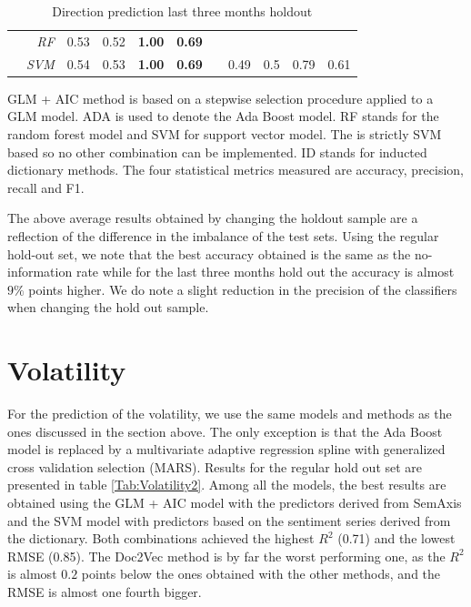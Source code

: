 \documentclass[a4paper, 12pt]{report}
\begin{document}
\begin{table}[H]
\begin{threeparttable}
\begin{tabular}{rrrrrrrrrrr}
      & \textit{RF} & 0.53 & 0.52 & \textbf{1.00} & \textbf{0.69} &  \multicolumn{5}{c}{}\\ 
      & \textit{SVM} & 0.54 & 0.53 & \textbf{1.00} & \textbf{0.69} & & 0.49 & 0.5 & 0.79 & 0.61\\
       \bottomrule
    \end{tabular}
    \begin{tablenotes}
      \footnotesize
      \item GLM + AIC method is based on a stepwise selection procedure applied to a GLM model. ADA is used to denote the Ada Boost model. RF stands for the random forest model and SVM for support vector model. The \textcite{Gupta:2020} is strictly SVM based so no other combination can be implemented. ID stands for inducted dictionary methods. The four statistical metrics measured are accuracy, precision, recall and F1.
    \end{tablenotes}
    \caption{Direction prediction last three months holdout}
    \label{Tab:acc cv3}
  \end{threeparttable}
    \end{table}
    
    The above average results obtained by changing the holdout sample are a reflection of the difference in the imbalance of the test sets. Using the regular hold-out set, we note that the best accuracy obtained is the same as the no-information rate while for the last three months hold out the accuracy is almost $9\%$ points higher. We do note a slight reduction in the precision of the classifiers when changing the hold out sample. 
    
    
    \section{Volatility}
    
    For the prediction of the volatility, we use the same models and methods as the ones discussed in the section above. The only exception is that the Ada Boost model is replaced by a multivariate adaptive regression spline with generalized cross validation selection (MARS). Results for the regular hold out set are presented in table \ref{Tab:Volatility2}. Among all the models, the best results are obtained using the GLM + AIC model with the predictors derived from SemAxis and the SVM model with predictors based on the sentiment series derived from the \textcite{Loughran:2011} dictionary. Both combinations achieved the highest $R^2$ (0.71) and the lowest RMSE (0.85). The Doc2Vec method is by far the worst performing one, as the $R^2$ is almost $0.2$ points below the ones obtained with the other methods, and the RMSE is almost one fourth bigger. %
    
\end{document}
